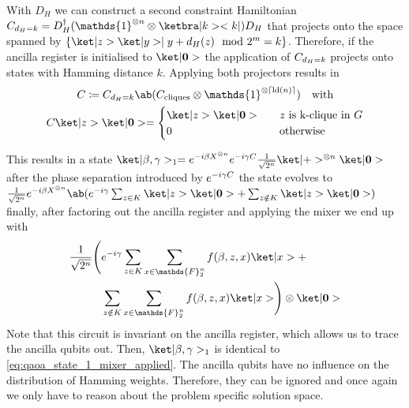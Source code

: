 With $D_H$ we can construct a second constraint Hamiltonian $\Cdhk = D_H^\dagger (\mathds{1}^{\otimes n} \otimes \ketbra|k><k|) D_H$ that projects onto the space spanned by $\{\ket|z>\ket|y> \mid y + d_H (z) \mod 2^m = k\}$. Therefore, if the ancilla register is initialised to $\ket|\bm{0}>$ the application of $C_{d_H = k}$ projects onto states with Hamming distance $k$. Applying both projectors results in
\begin{equation}
\begin{gathered}
    C \coloneqq \Cdhk \ab(\Ccliques \otimes \mathds{1}^{\otimes \lceil \lb(n) \rceil}) \quad \text{with}\\
    C\ket|z>\ket|\bm{0}> = \begin{cases}
        \ket|z>\ket|\bm{0}>  &\quad z \text{ is k-clique in } G \\
        0                        &\quad \text{otherwise}
    \end{cases}
\end{gathered}
\end{equation}

This results in a \QAOA state $\ket|\mangle, \pangle>_1 = e^{-i \mangle X^{\otimes n}} e^{-i \pangle C} \frac{1}{\sqrt{2^n}} \ket|+>^{\otimes n}\ket|\bm{0}>$ after the phase separation introduced by $e^{-i \gamma C}$ the state evolves to $\frac{1}{\sqrt{2^n}} e^{-i \mangle X^{\otimes n}} \ab( e^{-i \pangle} \sum_{z \in K} \ket|z>\ket|\bm{0}> + \sum_{z \notin K} \ket|z>\ket|\bm{0}>)$ finally, after factoring out the ancilla register and applying the mixer we end up with
\begin{displaymath}
\begin{aligned}
    \frac{1}{\sqrt{2^n}} \Biggl(&e^{-i \pangle} \sum_{z \in K} \sum_{x \in \mathds{F}_2^n} f(\mangle, z, x) \ket|x>  + \\ 
                                &\sum_{z \notin K} \sum_{x \in \mathds{F}_2^n} f(\mangle, z, x) \ket|x>\Biggr) \otimes \ket|\bm{0}>
\end{aligned}
\end{displaymath}
%
Note that this \QAOA circuit is invariant on the ancilla register, which 
allows us to trace the ancilla qubits out. Then, $\ket|\mangle, \pangle>_1$ 
is identical to \cref{eq:qaoa_state_1_mixer_applied}. The ancilla qubits have 
no influence on the distribution of Hamming weights. Therefore, they can be 
ignored and once again we only have to reason about the problem specific 
solution space.


